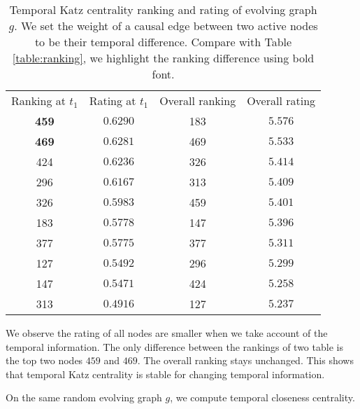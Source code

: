 \documentclass[12pt]{article}
\theoremstyle{definition}
\begin{document}
  \begin{table}[h]
    \begin{center}
  \begin{tabular}{ c | c | c | c }
    Ranking at $t_1$ & Rating at $t_1$ & Overall ranking & Overall rating \\
     \textbf{459} & $0.6290$ & 183 & $5.576$ \\
     \textbf{469} & $0.6281$ & 469 & $5.533$ \\
     424 & $0.6236$ & 326 & $5.414$ \\
     296 & $0.6167$ & 313 & $5.409$ \\
     326 & $0.5983$ & 459 & $5.401$ \\
     183 & $0.5778$ & 147 & $5.396$ \\
     377 & $0.5775$ & 377 & $5.311$ \\
     127 & $0.5492$ & 296 & $5.299$ \\
     147 & $0.5471$ & 424 & $5.258$ \\
     313 & $0.4916$ & 127 & $5.237$ \\
  \end{tabular}
  \end{center}
  \caption{Temporal Katz centrality ranking and rating of evolving graph $g$.
  We set the weight of a causal edge between two active nodes to be their temporal difference.
  Compare with Table \ref{table:ranking}, we highlight the ranking difference using bold font.}
  \label{table:ranking2}
  \end{table}

We observe the rating of all nodes are smaller when we take account of the temporal information. The only difference between the rankings of two table
is the top two nodes $459$ and $469$. The overall ranking stays unchanged.
This shows that temporal Katz centrality is stable for changing temporal information.

On the same random evolving graph $g$, we compute temporal closeness centrality.
\end{document}
